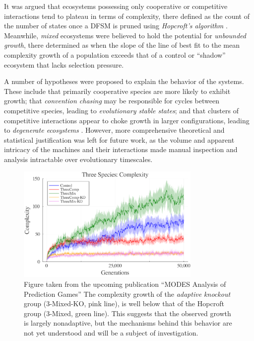 \documentclass{article}
\begin{document}
It was argued that ecosystems possessing only cooperative or competitive interactions tend to 
plateau in terms of complexity, there defined as the count of the number of states once a DFSM 
is pruned using \textit{Hopcroft's algorithm} \citep{Hopcroft1971AnNL}. Meanwhile, 
\textit{mixed} ecosystems were believed to hold the potential for \textit{unbounded growth}, 
there determined as when the slope of the line of best fit to the mean complexity growth of a 
population exceeds that of a control or ``shadow'' ecosystem that lacks selection pressure. 

A number of hypotheses were proposed to explain the behavior of the systems. These include that 
primarily cooperative species are more likely to exhibit growth; that \textit{convention chasing} 
may be responsible for cycles between competitive species, leading to 
\textit{evolutionary stable states}; and that clusters of competitive interactions appear to 
choke growth in larger configurations, leading to \textit{degenerate ecosystems} 
\citep{Ficici1998ChallengesIC,watson2001coevolutionary}. However, more comprehensive theoretical and statistical 
justification was left for future work, as the volume and apparent intricacy of the machines 
and their interactions made manual inspection and analysis intractable over evolutionary timescales. 

\begin{figure}[H]
    \begin{center}
        \includegraphics[width=3.5in]{3complex.png}
        \caption{Figure taken from the upcoming publication ``MODES Analysis of Prediction Games''
        The complexity growth of the \textit{adaptive knockout} group (3-Mixed-KO, pink line), is well below that 
        of the Hopcroft group (3-Mixed, green line). This suggests that the observed growth is 
        largely nonadaptive, but the mechanisms behind this behavior are not yet understood and will 
        be a subject of investigation.}
        \label{ecosystems}
    \end{center}
\end{figure}
\end{document}
